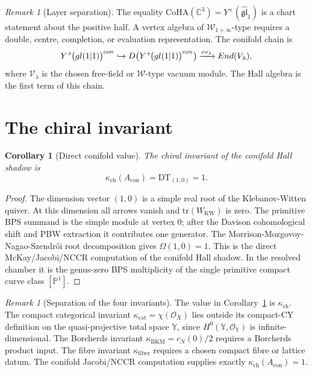 \documentclass[11pt]{amsart}
\providecommand{\C}{\mathbb{C}}
\providecommand{\bP}{\mathbb{P}}
\providecommand{\bY}{\mathbb{Y}}
\providecommand{\cO}{\mathcal{O}}
\providecommand{\CoHA}{\mathrm{CoHA}}
\providecommand{\DT}{\mathrm{DT}}
\providecommand{\tr}{\mathrm{tr}}
\providecommand{\kch}{\kappa_{\mathrm{ch}}}
\providecommand{\kcat}{\kappa_{\mathrm{cat}}}
\providecommand{\kBKM}{\kappa_{\mathrm{BKM}}}
\providecommand{\kfib}{\kappa_{\mathrm{fiber}}}
\theoremstyle{plain}
\newtheorem{corollary}[theorem]{Corollary}
\theoremstyle{definition}
\theoremstyle{remark}
\newtheorem{remark}[theorem]{Remark}
\begin{document}
\begin{remark}[Layer separation]\label{rem:no-w-confusion}
The equality \(\CoHA(\C^3)=Y^+(\widehat{\mathfrak{gl}}_1)\) is a
chart statement about the positive half.  A vertex algebra of
\(\mathcal{W}_{1+\infty}\)-type requires a double, centre, completion,
or evaluation representation.  The conifold chain is
\[
  Y^+\!\bigl(gl(1|1)\bigr)^{con}
  \hookrightarrow
  D\!\left(Y^+\!\bigl(gl(1|1)\bigr)^{con}\right)
  \xrightarrow{ev_\lambda}
  End(V_\lambda),
\]
where \(\mathcal V_\lambda\) is the chosen free-field or
\(\mathcal{W}\)-type vacuum module.  The Hall algebra is the first
term of this chain.
\end{remark}

\section{The chiral invariant}

\begin{corollary}[Direct conifold value]\label{cor:conifold-kappach}
The chiral invariant of the conifold Hall shadow is
\[
  \kch(A_{\mathrm{con}})=\DT_{(1,0)}=1 .
\]
\end{corollary}

\begin{proof}
The dimension vector \((1,0)\) is a simple real root of the
Klebanov-Witten quiver.  At this dimension all arrows vanish and
\(\tr(W_{\mathrm{KW}})\) is zero.  The primitive BPS summand is the
simple module at vertex \(0\); after the Davison cohomological shift and
PBW extraction it contributes one generator.  The
Morrison-Mozgovoy-Nagao-Szendr\H{o}i root decomposition gives
\(\Omega(1,0)=1\).  This is the direct McKay/Jacobi/NCCR computation of
the conifold Hall shadow.  In the resolved chamber it is the genus-zero
BPS multiplicity of the single primitive compact curve class
\([\bP^1]\).
\end{proof}

\begin{remark}[Separation of the four invariants]\label{rem:four-invariants}
The value in Corollary~\ref{cor:conifold-kappach} is
\(\kch\).  The compact categorical invariant
\(\kcat=\chi(\cO_X)\) lies outside its compact-CY definition on the
quasi-projective total space \(\bY\), since
\(H^0(\bY,\cO_{\bY})\) is infinite-dimensional.  The Borcherds invariant
\(\kBKM=c_N(0)/2\) requires a Borcherds product input.  The fibre
invariant \(\kfib\) requires a chosen compact fibre or lattice
datum.  The conifold Jacobi/NCCR computation supplies exactly
\(\kch(A_{\mathrm{con}})=1\).
\end{remark}
\end{document}
